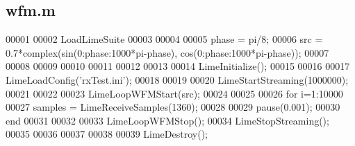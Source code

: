 \subsection{wfm.\+m}
\label{wfm_8m_source}

\begin{DoxyCode}
00001 %
00002 LoadLimeSuite
00003 
00004 %
00005 phase = pi/8;
00006 src = 0.7*complex(sin(0:phase:1000*pi-phase), cos(0:phase:1000*pi-phase));
00007 
00008 %
00009 %
00010 %
00011 %
00012 %
00013 %
00014 LimeInitialize();
00015 
00016 %
00017 LimeLoadConfig(\textcolor{stringliteral}{'rxTest.ini'});
00018 
00019 %
00020 LimeStartStreaming(1000000);
00021 
00022 %
00023 LimeLoopWFMStart(src);
00024 
00025 %
00026 \textcolor{keywordflow}{for} i=1:10000
00027     samples = LimeReceiveSamples(1360);
00028     %
00029     pause(0.001);
00030 end
00031 
00032 %
00033 LimeLoopWFMStop();
00034 LimeStopStreaming(); %
00035 
00036 
00037 
00038 %
00039 LimeDestroy();
\end{DoxyCode}
